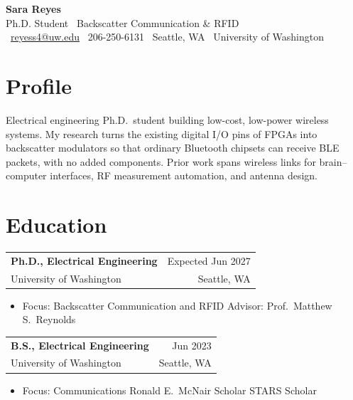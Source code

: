 \documentclass[10pt,letterpaper]{article}
\makeatletter
\newcommand{\job}[4]{%
  \begin{tabularx}{\linewidth}{@{}X r@{}}
    \textbf{#1} & \textcolor{muted}{#2}\\
    \textcolor{accent}{#3} & \textcolor{muted}{\small #4}
  \end{tabularx}\par}
\makeatother
\begin{document}
{\fontsize{26}{30}\selectfont\bfseries\color{accent} Sara Reyes}\\[2pt]
{\large\color{muted} Ph.D. Student \textbullet\ Backscatter Communication \& RFID}\\[6pt]
{\small
\faEnvelope\ \href{mailto:reyess4@uw.edu}{reyess4@uw.edu}\hspace{1.4em}
\faPhone\ 206-250-6131\hspace{1.4em}
\faMapMarker*\ Seattle, WA\hspace{1.4em}
\faUniversity\ University of Washington}

\section{Profile}
Electrical engineering Ph.D.\ student building low-cost, low-power wireless systems. My research turns
the existing digital I/O pins of FPGAs into backscatter modulators so that ordinary Bluetooth
chipsets can receive BLE packets, with no added components. Prior work spans wireless links for
brain--computer interfaces, RF measurement automation, and antenna design.

\section{Education}
\job{Ph.D., Electrical Engineering}{Expected Jun 2027}{University of Washington}{Seattle, WA}
\begin{itemize}
  \item Focus: Backscatter Communication and RFID \quad\textbullet\quad Advisor: Prof.\ Matthew S.\ Reynolds
\end{itemize}
\vspace{4pt}
\job{B.S., Electrical Engineering}{Jun 2023}{University of Washington}{Seattle, WA}
\begin{itemize}
  \item Focus: Communications \quad\textbullet\quad Ronald E.\ McNair Scholar \quad\textbullet\quad STARS Scholar
\end{itemize}

\end{document}
